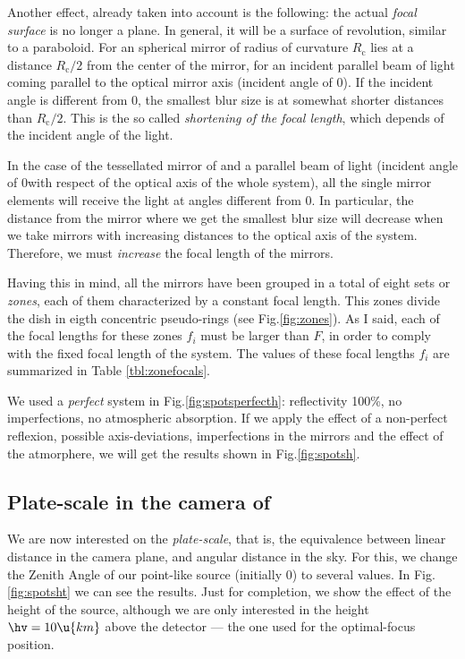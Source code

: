 Another effect, already taken into account is the following: the
actual \emph{focal surface} is no longer a plane. In general, it will
be a surface of revolution, similar to a paraboloid. For an spherical
mirror of radius of curvature $R_{\mathrm{c}}$ lies at a distance
$R_{\mathrm{c}}/2$ from the center of the mirror, for an incident
parallel beam of light coming parallel to the optical mirror axis
(incident angle of 0\deg).  If the incident angle is different from
0\deg, the smallest blur size is at somewhat shorter distances than
$R_{\mathrm{c}}/2$. This is the so called \emph{shortening of the
  focal length}, which depends of the incident angle of the light.

In the case of the tessellated mirror of \MAGIC and a parallel beam of
light (incident angle of 0\deg with respect of the optical axis of the
whole system), all the single mirror elements will receive the light
at angles different from 0\deg. In particular, the distance from the
mirror where we get the smallest blur size will decrease when we take
mirrors with increasing distances to the optical axis of the system.
Therefore, we must \emph{increase} the focal length of the mirrors. 

Having this in mind, all the mirrors have been grouped in a total of
eight sets or \emph{zones}, each of them characterized by a constant
focal length. This zones divide the dish in eigth concentric
pseudo-rings (see Fig.\ref{fig:zones}). As I said, each of the
focal lengths for these zones $f_i$ must be larger than $F$, in order
to comply with the fixed focal length of the system. The values of
these focal lengths $f_i$ are summarized in Table
\ref{tbl:zonefocals}.

We used a \emph{perfect} system in Fig.\ref{fig:spotsperfecth}:
reflectivity 100\%, no imperfections, no atmospheric absorption. If we
apply the effect of a non-perfect reflexion, possible axis-deviations,
imperfections in the mirrors and the effect of the atmorphere, we will
get the results shown in Fig.\ref{fig:spotsh}.

\subsection{Plate-scale in the camera of \MAGIC}

We are now interested on the \emph{plate-scale}, that is, the
equivalence between linear distance in the camera plane, and angular
distance in the sky. For this, we change the Zenith Angle of our
point-like source (initially 0\deg) to several values. In
Fig.\ref{fig:spotsht} we can see the results. Just for completion, we
show the effect of the height of the source, although we are only
interested in the height $\hv=10\u{km}$ above the detector --- the one
used for the optimal-focus position.

